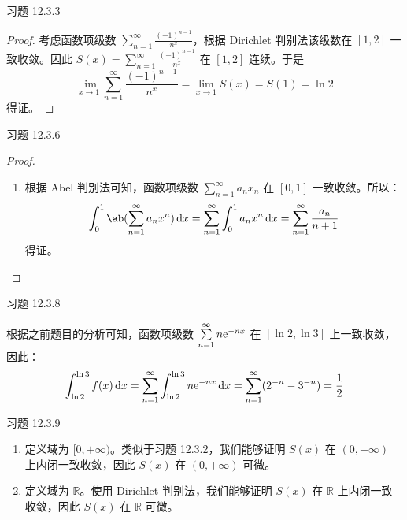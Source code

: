 \begin{problem}
    习题 12.3.3
    \begin{proof}
        考虑函数项级数 $\sum\limits_{n = 1}^{\infty} \frac{(-1)^{n - 1}}{n^{x}}$，根据 Dirichlet 判别法该级数在 $[1, 2]$ 一致收敛。因此 $S(x) = \sum\limits_{n = 1}^{\infty} \frac{(-1)^{n - 1}}{n^{x}}$ 在 $[1, 2]$ 连续。于是
        $$
        \lim_{x \to 1} \sum_{n = 1}^{\infty} \frac{(-1)^{n - 1}}{n^{x}} = \lim_{x \to 1} S(x) = S(1) = \ln 2
        $$
        得证。
    \end{proof}
\end{problem}

\begin{problem}
    习题 12.3.6
    \begin{proof}
        \begin{enumerate}
            \item[\textbf{2)}] 根据 Abel 判别法可知，函数项级数 $\sum\limits_{n = 1}^{\infty} a_n x_n$ 在 $[0, 1]$ 一致收敛。所以：
            $$
            \int_0^1 \ab(\sum_{n = 1}^{\infty} a_n x^n) \dd{x} = \sum_{n = 1}^{\infty} \int_0^1 a_n x^n \dd{x} = \sum_{n = 1}^{\infty} \frac{a_n}{n + 1}
            $$
            得证。
        \end{enumerate}
    \end{proof}
\end{problem}

\begin{problem}
    习题 12.3.8
    \begin{solution}
        根据之前题目的分析可知，函数项级数 $\sum\limits_{n = 1}^{\infty} n \mathrm{e}^{-n x}$ 在 $[\ln 2, \ln 3]$ 上一致收敛，因此：
        $$
        \int_{\ln 2}^{\ln 3} f(x) \dd{x} = \sum_{n = 1}^{\infty} \int_{\ln 2}^{\ln 3} n \mathrm{e}^{-n x} \dd{x} = \sum_{n = 1}^{\infty} (2^{-n} - 3^{-n}) = \frac{1}{2}
        $$
    \end{solution}
\end{problem}

\begin{problem}
    习题 12.3.9
    \begin{solution}
        \begin{enumerate}
            \item[\textbf{2)}] 定义域为 $[0, + \infty)$。类似于习题 12.3.2，我们能够证明 $S(x)$ 在 $(0, + \infty)$ 上内闭一致收敛，因此 $S(x)$ 在 $(0, + \infty)$ 可微。

            \item[\textbf{3)}] 定义域为 $\mathbb{R}$。使用 Dirichlet 判别法，我们能够证明 $S(x)$ 在 $\mathbb{R}$ 上内闭一致收敛，因此 $S(x)$ 在 $\mathbb{R}$ 可微。
        \end{enumerate}
    \end{solution}
\end{problem}

